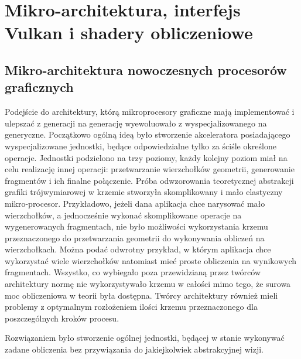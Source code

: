 \chapter{Mikro-architektura, interfejs Vulkan i shadery obliczeniowe}
\label{cha:vulkan_micro_shaders}

\section{Mikro-architektura nowoczesnych procesorów graficznych}
\label{sec:micro}

Podejście do architektury, którą mikroprocesory graficzne mają implementować i ulepszać z generacji na generację wyewoluowało z wyspecjalizowanego na generyczne.
Początkowo ogólną ideą było stworzenie akceleratora posiadającego wyspecjalizowane jednostki, będące odpowiedzialne tylko za ściśle określone operacje.
Jednostki podzielono na trzy poziomy, każdy kolejny poziom miał na celu realizację innej operacji: przetwarzanie wierzchołków geometrii, generowanie fragmentów i ich finalne połączenie.
Próba odwzorowania teoretycznej abstrakcji grafiki trójwymiarowej w krzemie stworzyła skomplikowany i mało elastyczny mikro-procesor.
Przykładowo, jeżeli dana aplikacja chce narysować mało wierzchołków, a jednocześnie wykonać skomplikowane operacje na wygenerowanych fragmentach, nie było możliwości wykorzystania krzemu przeznaczonego do przetwarzania geometrii do wykonywania obliczeń na wierzchołkach.
Można podać odwrotny przykład, w którym aplikacja chce wykorzystać wiele wierzchołków natomiast mieć proste obliczenia na wynikowych fragmentach.
Wszystko, co wybiegało poza przewidzianą przez twórców architektury normę nie wykorzystywało krzemu w całości mimo tego, że surowa moc obliczeniowa w teorii była dostępna.
Twórcy architektury również mieli problemy z optymalnym rozłożeniem ilości krzemu przeznaczonego dla poszczególnych kroków procesu. 

Rozwiązaniem było stworzenie ogólnej jednostki, będącej w stanie wykonywać zadane obliczenia bez przywiązania do jakiejkolwiek abstrakcyjnej wizji.

